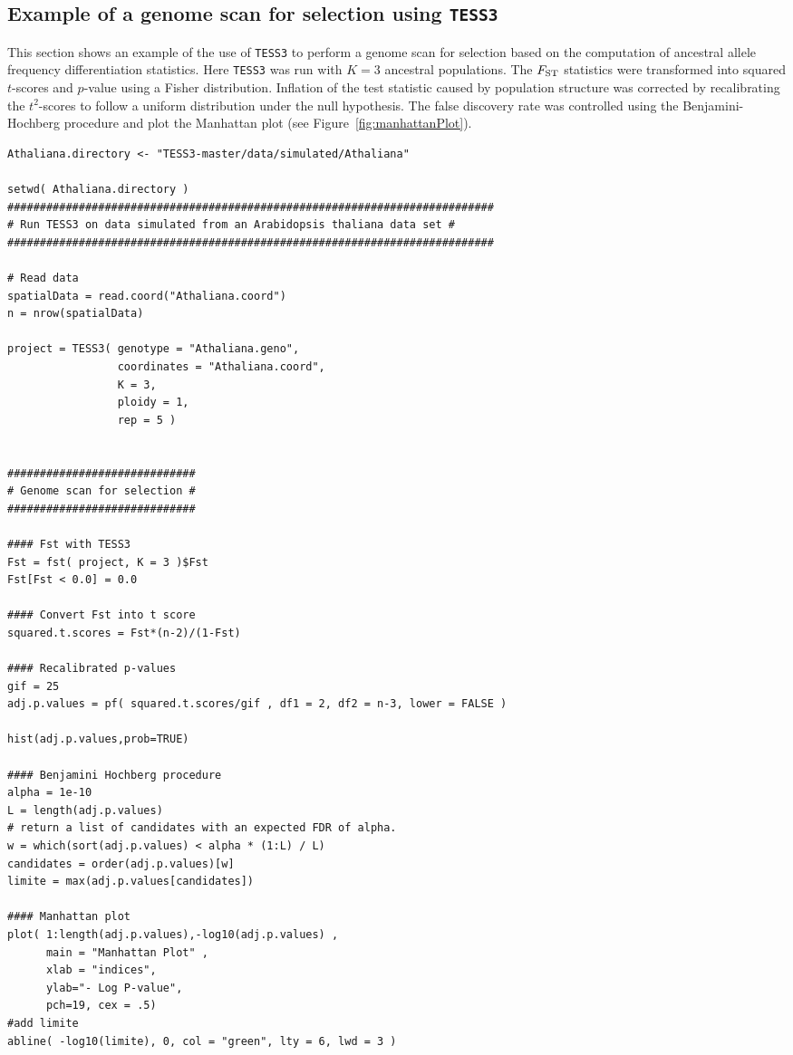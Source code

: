 \documentclass[10pt,a4paper]{article}
\begin{document}
\subsection{Example of a genome scan for selection using {\tt TESS3}}
This section shows an example of the use of {\tt TESS3} to perform a genome scan for selection based on the computation of ancestral allele frequency differentiation statistics. Here {\tt TESS3} was run with $K = 3$ ancestral populations. The $F_{\rm ST}$ statistics were transformed into squared $t$-scores and $p$-value using a Fisher distribution. Inflation of the test statistic caused by population structure was corrected by recalibrating the $t^2$-scores to follow a uniform distribution under the null hypothesis. The false discovery rate was controlled using the Benjamini-Hochberg procedure and plot the Manhattan plot (see Figure~\ref{fig:manhattanPlot}).


\newpage

\begin{Verbatim}[frame=single]
Athaliana.directory <- "TESS3-master/data/simulated/Athaliana"

setwd( Athaliana.directory )
###########################################################################
# Run TESS3 on data simulated from an Arabidopsis thaliana data set #
###########################################################################

# Read data
spatialData = read.coord("Athaliana.coord")
n = nrow(spatialData)

project = TESS3( genotype = "Athaliana.geno", 
                 coordinates = "Athaliana.coord", 
                 K = 3, 
                 ploidy = 1, 
                 rep = 5 )


#############################
# Genome scan for selection #
#############################

#### Fst with TESS3 
Fst = fst( project, K = 3 )$Fst
Fst[Fst < 0.0] = 0.0

#### Convert Fst into t score
squared.t.scores = Fst*(n-2)/(1-Fst)

#### Recalibrated p-values
gif = 25
adj.p.values = pf( squared.t.scores/gif , df1 = 2, df2 = n-3, lower = FALSE )

hist(adj.p.values,prob=TRUE)

#### Benjamini Hochberg procedure
alpha = 1e-10
L = length(adj.p.values)
# return a list of candidates with an expected FDR of alpha.
w = which(sort(adj.p.values) < alpha * (1:L) / L)
candidates = order(adj.p.values)[w]
limite = max(adj.p.values[candidates])

#### Manhattan plot 
plot( 1:length(adj.p.values),-log10(adj.p.values) , 
      main = "Manhattan Plot" , 
      xlab = "indices", 
      ylab="- Log P-value", 
      pch=19, cex = .5) 
#add limite
abline( -log10(limite), 0, col = "green", lty = 6, lwd = 3 )
\end{Verbatim}
\end{document}
